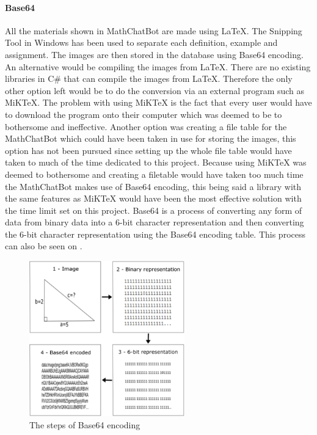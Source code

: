\paragraph{Base64}

All the materials shown in MathChatBot are made using LaTeX. The Snipping Tool in Windows has been used to separate each definition, example and assignment. The images are then stored in the database using Base64 encoding. An alternative would be compiling the images from LaTeX. There are no existing libraries in C\# that can compile the images from LaTeX. Therefore the only other option left would be to do the conversion via an external program such as MiKTeX. The problem with using MiKTeX is the fact that every user would have to download the program onto their computer which was deemed to be to bothersome and ineffective. Another option was creating a file table for the MathChatBot which could have been taken in use for storing the images, this option has not been pursued since setting up the whole file table would have taken to much of the time dedicated to this project. Because using MiKTeX was deemed to bothersome and creating a filetable would have taken too much time the MathChatBot makes use of Base64 encoding, this being said a library with the same features as MiKTeX would have been the most effective solution with the time limit set on this project. Base64 is a process of converting any form of data from binary data into a 6-bit character representation and then converting the 6-bit character representation using the Base64 encoding table. This process can also be seen on .

\begin{figure}[H]
    \centering
    \includegraphics[width=0.6\textwidth]{figures/image1412.png}
    \caption{The steps of Base64 encoding \cite{DemoAPI}}
    \label{fig:base64_encoding}
\end{figure}

